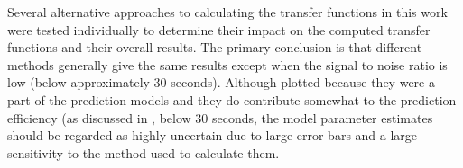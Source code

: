 \documentclass[draft,linenumbers]{agujournal2018}
\begin{document}

Several alternative approaches to calculating the transfer functions in this work were tested individually to determine their impact on the computed transfer functions and their overall results. The primary conclusion is that different methods generally give the same results except when the signal to noise ratio is low (below approximately $30$ seconds). Although plotted because they were a part of the prediction models and they do contribute somewhat to the prediction efficiency (as discussed in \cite{Weigel2017}, below $30$ seconds, the model parameter estimates should be regarded as highly uncertain due to large error bars and a large sensitivity to the method used to calculate them.
\end{document}
